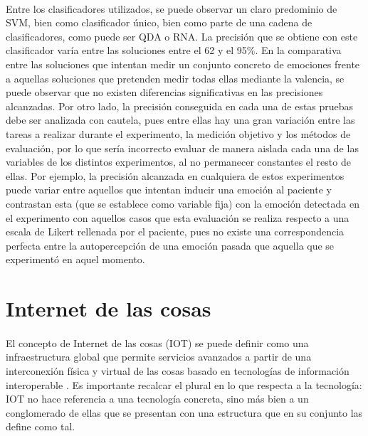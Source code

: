 \paragraph{}
Entre los clasificadores utilizados, se puede observar un claro predominio de SVM, bien como clasificador único, bien como parte de una cadena de clasificadores, como puede ser QDA o RNA. La precisión que se obtiene con este clasificador varía entre las soluciones entre el 62 y el 95\%. En la comparativa entre las soluciones que intentan medir un conjunto concreto de emociones frente a aquellas soluciones que pretenden medir todas ellas mediante la valencia, se puede observar que no existen diferencias significativas en las precisiones alcanzadas. Por otro lado, la precisión conseguida en cada una de estas pruebas debe ser analizada con cautela, pues entre ellas hay una gran variación entre las tareas a realizar durante el experimento, la medición objetivo y los métodos de evaluación, por lo que sería incorrecto evaluar de manera aislada cada una de las variables de los distintos experimentos, al no permanecer constantes el resto de ellas. Por ejemplo, la precisión alcanzada en cualquiera de estos experimentos puede variar entre aquellos que intentan inducir una emoción al paciente y contrastan esta (que se establece como variable fija) con la emoción detectada en el experimento con aquellos casos que esta evaluación se realiza respecto a una escala de Likert rellenada por el paciente, pues no existe una correspondencia perfecta entre la autopercepción de una emoción pasada que aquella que se experimentó en aquel momento.


\section{Internet de las cosas}
\label{sec:iot}
\paragraph{}
El concepto de Internet de las cosas (IOT) se puede definir como una infraestructura global que permite servicios avanzados a partir de una interconexión física y virtual de las cosas basado en tecnologías de información interoperable \citep{itu2012new}. Es importante recalcar el plural en lo que respecta a la tecnología: IOT no hace referencia a una tecnología concreta, sino más bien a un conglomerado de ellas que se presentan con una estructura que en su conjunto las define como tal.

